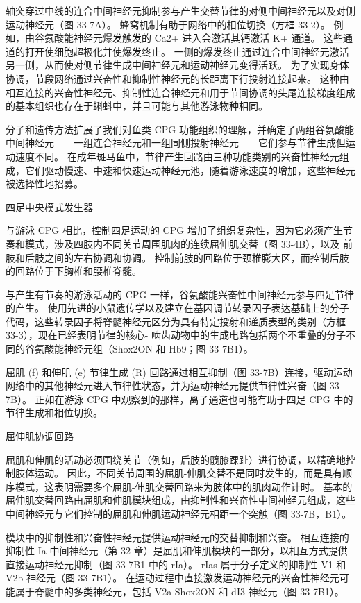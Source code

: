 轴突穿过中线的连合中间神经元抑制参与产生交替节律的对侧中间神经元以及对侧运动神经元（图 33-7A）。 蜂窝机制有助于网络中的相位切换（方框 33-2）。 例如，由谷氨酸能神经元爆发触发的 Ca2+ 进入会激活其钙激活 K+ 通道。 这些通道的打开使细胞超极化并使爆发终止。 一侧的爆发终止通过连合中间神经元激活另一侧，从而使对侧节律生成中间神经元和运动神经元变得活跃。 为了实现身体协调，节段网络通过兴奋性和抑制性神经元的长距离下行投射连接起来。 这种由相互连接的兴奋性神经元、抑制性连合神经元和用于节间协调的头尾连接梯度组成的基本组织也存在于蝌蚪中，并且可能与其他游泳物种相同。

分子和遗传方法扩展了我们对鱼类 CPG 功能组织的理解，并确定了两组谷氨酸能中间神经元——一组连合神经元和一组同侧投射神经元——它们参与节律生成但运动速度不同。 在成年斑马鱼中，节律产生回路由三种功能类别的兴奋性神经元组成，它们驱动慢速、中速和快速运动神经元池，随着游泳速度的增加，这些神经元被选择性地招募。

四足中央模式发生器

与游泳 CPG 相比，控制四足运动的 CPG 增加了组织复杂性，因为它必须产生节奏和模式，涉及四肢内不同关节周围肌肉的连续屈伸肌交替（图 33-4B），以及 前肢和后肢之间的左右协调和协调。 控制前肢的回路位于颈椎膨大区，而控制后肢的回路位于下胸椎和腰椎脊髓。

与产生有节奏的游泳活动的 CPG 一样，谷氨酸能兴奋性中间神经元参与四足节律的产生。 使用先进的小鼠遗传学以及建立在基因调节转录因子表达基础上的分子代码，这些转录因子将脊髓神经元区分为具有特定投射和递质表型的类别（方框 33-3），现在已经表明节律的核心- 啮齿动物中的生成电路包括两个不重叠的分子不同的谷氨酸能神经元组（Shox2ON 和 Hb9；图 33-7B1）。

屈肌 (f) 和伸肌 (e) 节律生成 (R) 回路通过相互抑制（图 33-7B）连接，驱动运动网络中的其他神经元进入节律性状态，并为运动神经元提供节律性兴奋（图 33-7B）。 正如在游泳 CPG 中观察到的那样，离子通道也可能有助于四足 CPG 中的节律生成和相位切换。

屈伸肌协调回路

屈肌和伸肌的活动必须围绕关节（例如，后肢的髋膝踝趾）进行协调，以精确地控制肢体运动。 因此，不同关节周围的屈肌-伸肌交替不是同时发生的，而是具有顺序模式，这表明需要多个屈肌-伸肌交替回路来为肢体中的肌肉动作计时。 基本的屈伸肌交替回路由屈肌和伸肌模块组成，由抑制性和兴奋性中间神经元组成，这些中间神经元与它们控制的屈肌和伸肌运动神经元相距一个突触（图 33-7B，B1）。

模块中的抑制性和兴奋性神经元提供运动神经元的交替抑制和兴奋。 相互连接的抑制性 Ia 中间神经元（第 32 章）是屈肌和伸肌模块的一部分，以相互方式提供直接运动神经元抑制（图 33-7B1 中的 rIa）。 rIas 属于分子定义的抑制性 V1 和 V2b 神经元（图 33-7B1）。 在运动过程中直接激发运动神经元的兴奋性神经元可能属于脊髓中的多类神经元，包括 V2a-Shox2ON 和 dI3 神经元（图 33-7B1）。

